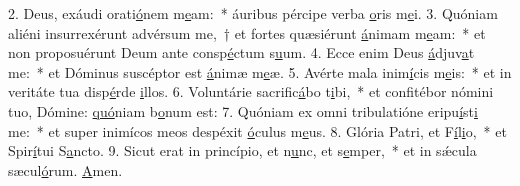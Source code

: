 2. Deus, exáudi orati\uline{ó}nem m\uline{e}am:~* áuribus pércipe verba \uline{o}ris m\uline{e}i.
3. Quóniam aliéni insurrexérunt advérsum me,~† et fortes quæsiérunt \uline{á}nimam m\uline{e}am:~* et non proposuérunt Deum ante consp\uline{é}ctum s\uline{u}um.
4. Ecce enim Deus \uline{á}djuv\uline{a}t me:~* et Dóminus suscéptor est \uline{á}nimæ m\uline{e}æ.
5. Avérte mala inim\uline{í}cis m\uline{e}is:~* et in veritáte tua disp\uline{é}rde \uline{i}llos.
6. Voluntárie sacrific\uline{á}bo t\uline{i}bi,~* et confitébor nómini tuo, Dómine: \uline{quó}niam b\uline{o}num est:
7. Quóniam ex omni tribulatióne eripu\uline{í}st\uline{i} me:~* et super inimícos meos despéxit \uline{ó}culus m\uline{e}us.
8. Glória Patri, et F\uline{í}l\uline{i}o,~* et Spir\uline{í}tui S\uline{a}ncto.
9. Sicut erat in princípio, et n\uline{u}nc, et s\uline{e}mper,~* et in sǽcula sæcul\uline{ó}rum. \uline{A}men.
